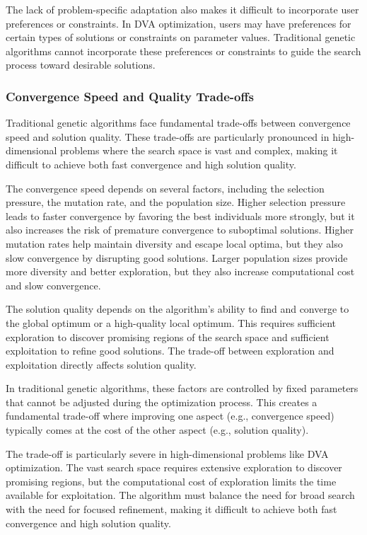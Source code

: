 \documentclass[12pt,a4paper]{article}
\begin{document}
The lack of problem-specific adaptation also makes it difficult to incorporate user preferences or constraints. In DVA optimization, users may have preferences for certain types of solutions or constraints on parameter values. Traditional genetic algorithms cannot incorporate these preferences or constraints to guide the search process toward desirable solutions.

\subsubsection{Convergence Speed and Quality Trade-offs}

Traditional genetic algorithms face fundamental trade-offs between convergence speed and solution quality. These trade-offs are particularly pronounced in high-dimensional problems where the search space is vast and complex, making it difficult to achieve both fast convergence and high solution quality.

The convergence speed depends on several factors, including the selection pressure, the mutation rate, and the population size. Higher selection pressure leads to faster convergence by favoring the best individuals more strongly, but it also increases the risk of premature convergence to suboptimal solutions. Higher mutation rates help maintain diversity and escape local optima, but they also slow convergence by disrupting good solutions. Larger population sizes provide more diversity and better exploration, but they also increase computational cost and slow convergence.

The solution quality depends on the algorithm's ability to find and converge to the global optimum or a high-quality local optimum. This requires sufficient exploration to discover promising regions of the search space and sufficient exploitation to refine good solutions. The trade-off between exploration and exploitation directly affects solution quality.

In traditional genetic algorithms, these factors are controlled by fixed parameters that cannot be adjusted during the optimization process. This creates a fundamental trade-off where improving one aspect (e.g., convergence speed) typically comes at the cost of the other aspect (e.g., solution quality).

The trade-off is particularly severe in high-dimensional problems like DVA optimization. The vast search space requires extensive exploration to discover promising regions, but the computational cost of exploration limits the time available for exploitation. The algorithm must balance the need for broad search with the need for focused refinement, making it difficult to achieve both fast convergence and high solution quality.
\end{document}
